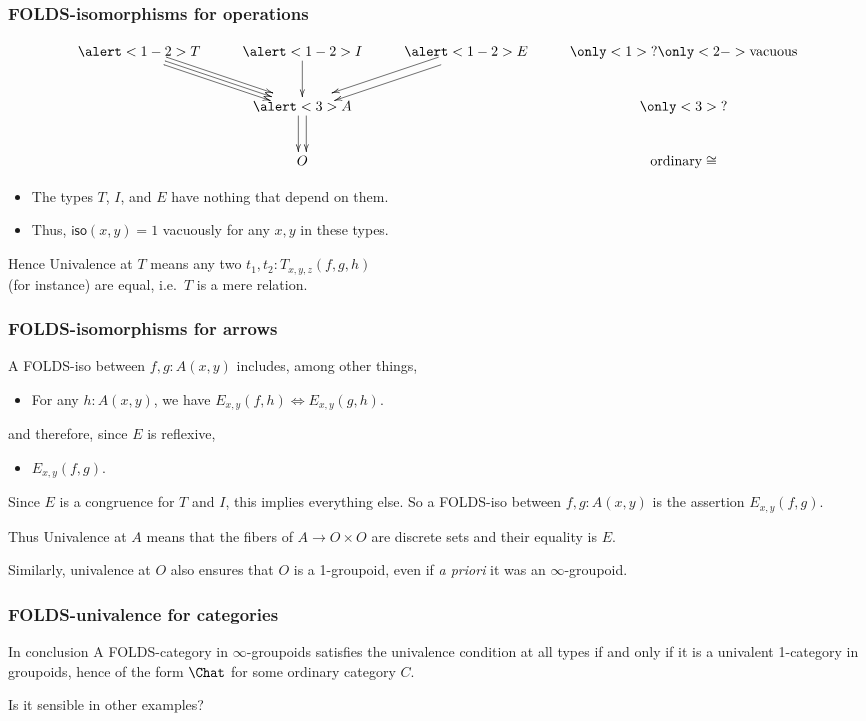 \documentclass{beamer}
\begin{document}
\begin{frame}
  \frametitle{FOLDS-isomorphisms for operations}
  \[
  \vcenter{\xymatrix{
      \alert<1-2>{T} \ar[dr] \ar@<1mm>[dr] \ar@<-1mm>[dr] & \alert<1-2>{I} \ar[d] & \alert<1-2>{E} \ar@<1mm>[dl] \ar@<-1mm>[dl] &
      \only<1>{?}\only<2->{\text{vacuous}}\\
      & \alert<3>{A} \ar@<1mm>[d] \ar@<-1mm>[d] && \only<3>{?} \\
      & {O}&& \text{ordinary} \cong}}
  \]
  \pause
  \begin{itemize}
  \item The types $T$, $I$, and $E$ have \alert<2>{nothing} that depend on them.
  \item Thus, $\mathsf{iso}(x,y)=1$ vacuously for any $x,y$ in these types.
  \end{itemize}
  \begin{block}{Hence}
    Univalence at $T$ means any two $t_1,t_2 : T_{x,y,z}(f,g,h)$\\ (for instance) are equal, i.e.\ $T$ is a mere relation.
  \end{block}
\end{frame}

\begin{frame}
  \frametitle{FOLDS-isomorphisms for arrows}
  A FOLDS-iso between $f,g:A(x,y)$ includes, among other things,
  \begin{itemize}
  \item For any $h:A(x,y)$, we have $E_{x,y}(f,h) \iff E_{x,y}(g,h)$.
  \end{itemize}
  and therefore, since $E$ is reflexive,
  \begin{itemize}
  \item $E_{x,y}(f,g)$.
  \end{itemize}
  Since $E$ is a congruence for $T$ and $I$, this implies everything else.
  So \alert{a FOLDS-iso between $f,g:A(x,y)$ is the assertion $E_{x,y}(f,g)$.}
  \begin{block}{Thus}
    Univalence at $A$ means that the fibers of $A\to O\times O$ are discrete sets and their equality is $E$.
  \end{block}
    Similarly, univalence at $O$ also ensures that $O$ is a 1-groupoid, even if \textit{a priori} it was an $\infty$-groupoid.
\end{frame}

\begin{frame}
  \frametitle{FOLDS-univalence for categories}
  \begin{block}{In conclusion}
    A FOLDS-category in $\infty$-groupoids satisfies the univalence condition at all types if and only if it is a univalent 1-category in groupoids, hence of the form $\Chat$ for some ordinary category $C$.
  \end{block}
  \vspace{1cm}
  Is it sensible in other examples?
\end{frame}
\end{document}
